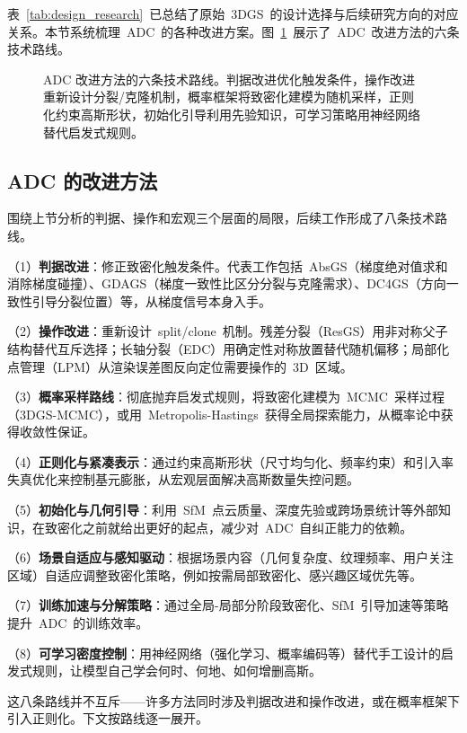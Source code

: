 表~\ref{tab:design_research}~已总结了原始~3DGS~的设计选择与后续研究方向的对应关系。本节系统梳理~ADC~的各种改进方案。图~\ref{fig:02_adc_taxonomy}~展示了~ADC~改进方法的六条技术路线。

\begin{figure}[htbp]
\centering
\resizebox{0.85\textwidth}{!}{}
\caption{ADC 改进方法的六条技术路线。判据改进优化触发条件，操作改进重新设计分裂/克隆机制，概率框架将致密化建模为随机采样，正则化约束高斯形状，初始化引导利用先验知识，可学习策略用神经网络替代启发式规则。}
\label{fig:02_adc_taxonomy}
\end{figure}

\subsection{ADC 的改进方法}

围绕上节分析的判据、操作和宏观三个层面的局限，后续工作形成了八条技术路线。

（1）\textbf{判据改进}：修正致密化触发条件。代表工作包括~AbsGS（梯度绝对值求和消除梯度碰撞）、GDAGS（梯度一致性比区分分裂与克隆需求）、DC4GS（方向一致性引导分裂位置）等，从梯度信号本身入手。

（2）\textbf{操作改进}：重新设计~split/clone~机制。残差分裂（ResGS）用非对称父子结构替代互斥选择；长轴分裂（EDC）用确定性对称放置替代随机偏移；局部化点管理（LPM）从渲染误差图反向定位需要操作的~3D~区域。

（3）\textbf{概率采样路线}：彻底抛弃启发式规则，将致密化建模为~MCMC~采样过程（3DGS-MCMC），或用~Metropolis-Hastings~获得全局探索能力，从概率论中获得收敛性保证。

（4）\textbf{正则化与紧凑表示}：通过约束高斯形状（尺寸均匀化、频率约束）和引入率失真优化来控制基元膨胀，从宏观层面解决高斯数量失控问题。

（5）\textbf{初始化与几何引导}：利用~SfM~点云质量、深度先验或跨场景统计等外部知识，在致密化之前就给出更好的起点，减少对~ADC~自纠正能力的依赖。

（6）\textbf{场景自适应与感知驱动}：根据场景内容（几何复杂度、纹理频率、用户关注区域）自适应调整致密化策略，例如按需局部致密化、感兴趣区域优先等。

（7）\textbf{训练加速与分解策略}：通过全局-局部分阶段致密化、SfM~引导加速等策略提升~ADC~的训练效率。

（8）\textbf{可学习密度控制}：用神经网络（强化学习、概率编码等）替代手工设计的启发式规则，让模型自己学会何时、何地、如何增删高斯。

这八条路线并不互斥——许多方法同时涉及判据改进和操作改进，或在概率框架下引入正则化。下文按路线逐一展开。

